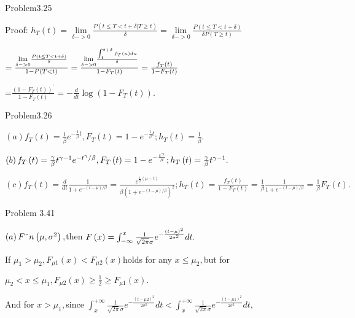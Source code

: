 \documentclass{article}
\begin{document}
\bigskip

Problem3.25

Proof: $h_{T}\left( t\right) =\underset{\delta ->0}{\lim }\frac{P\left(
t\leq T<t+\delta |T\geq t\right) }{\delta }=\underset{\delta ->0}{\lim }%
\frac{P\left( t\leq T<t+\delta \right) }{\delta P\left( T\geq t\right) }$

$=\frac{\underset{\delta ->0}{\lim }\frac{P\left( t\leq T<t+\delta \right) }{%
\delta }}{1-P\left( T<t\right) }=\frac{\underset{\delta ->0}{\lim }\frac{%
\int_{t}^{t+\delta }f_{T}\left( u\right) du}{\delta }}{1-F_{T}\left(
t\right) }=\frac{f_{T}\left( t\right) }{1-F_{T}\left( t\right) }$

=$\frac{\left( 1-F_{T}\left( t\right) \right) ^{\prime }}{1-F_{T}\left(
t\right) }=-\frac{d}{dt}\log \left( 1-F_{T}\left( t\right) \right) .$

Problem3.26

$\left( a\right) f_{T}\left( t\right) =\frac{1}{\beta }e^{-\frac{1}{\beta }%
t},F_{T}\left( t\right) =1-e^{-\frac{1}{\beta }t};h_{T}\left( t\right) =%
\frac{1}{\beta }.$

$\left( b\right) f_{T}\left( t\right) =\frac{\gamma }{\beta }t^{\gamma
-1}e^{-t^{\gamma }/\beta },F_{T}\left( t\right) =1-e^{-\frac{t^{\gamma }}{%
\beta }};h_{T}\left( t\right) =\frac{\gamma }{\beta }t^{\gamma -1}.$

$\left( c\right) f_{T}\left( t\right) =\frac{d}{dt}\frac{1}{1+e^{-\left(
t-\mu \right) /\beta }}=\allowbreak \frac{e^{\frac{1}{\beta }\left( \mu
-t\right) }}{\beta \left( 1+e^{-\left( t-\mu \right) /\beta }\right) ^{2}}%
;h_{T}\left( t\right) =\frac{f_{T}\left( t\right) }{1-F_{T}\left( t\right) }=%
\frac{1}{\beta }\frac{1}{1+e^{-\left( t-\mu \right) /\beta }}=\frac{1}{\beta 
}F_{T}\left( t\right) .$

Problem 3.41

$\left( a\right) F\symbol{126}n\left( \mu ,\sigma ^{2}\right) ,$then $%
F\left( x\right) =\int_{-\infty }^{x}\frac{1}{\sqrt{2\pi }\sigma }e^{-\frac{%
\left( t-\mu \right) ^{2}}{2\sigma ^{2}}}dt.\qquad $

If $\mu _{1}>\mu _{2},F_{\mu 1}(x)<F_{\mu 2}\left( x\right) $holds for any $%
x\leq \mu _{2},$but for

$\mu _{2}<x\leq \mu _{1},F_{\mu 2}\left( x\right) \geq \frac{1}{2}\geq
F_{\mu 1}\left( x\right) .$

And for $x>\mu _{1},$since $\int_{x}^{+\infty }\frac{1}{\sqrt{2\pi }\sigma }%
e^{-\frac{\left( t-\mu 2\right) ^{2}}{2\sigma ^{2}}}dt<\int_{x}^{+\infty }%
\frac{1}{\sqrt{2\pi }\sigma }e^{-\frac{\left( t-\mu 1\right) ^{2}}{2\sigma
^{2}}}dt,$
\end{document}
